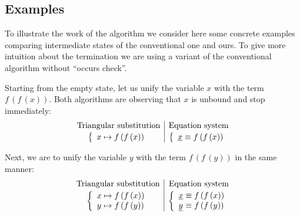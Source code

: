 \subsection{Examples}

To illustrate the work of the algorithm we consider here some concrete examples comparing intermediate states of the conventional one and ours. To give more intuition
about the termination we are using a variant of the conventional algorithm without ``occurs check''.

Starting from the empty state, let us unify the variable $x$ with the term $f\,(f\,(x))$. Both algorithms are observing that $x$ is unbound and stop immediately:
\begin{equation*}
    \begin{array}{c|c}
        \text{Triangular substitution} & \text{Equation system} \\[2pt]
        \left\{\begin{array}{l@{{}\mapsto{}}l}
            x & f\,(f\,(x)) \\
        \end{array}\right. & \left\{\begin{array}{l@{{}\equiv{}}l}
            \underline{x} & f\,(f\,(x)) \\
        \end{array}\right.
    \end{array}
\end{equation*}

Next, we are to unify the variable $y$ with the term $f\,(f\,(y))$ in the same manner:
\begin{equation}
    \begin{array}{c|c}
        \text{Triangular substitution} & \text{Equation system} \\[2pt]
        \left\{\begin{array}{l@{{}\mapsto{}}l}
            x & f\,(f\,(x)) \\
            y & f\,(f\,(y)) \\
        \end{array}\right. & \left\{\begin{array}{l@{{}\equiv{}}l}
            \underline{x} & f\,(f\,(x)) \\
            \underline{y} & f\,(f\,(y)) \\
        \end{array}\right.
    \end{array}
    \label{eq:example-state}
\end{equation}

